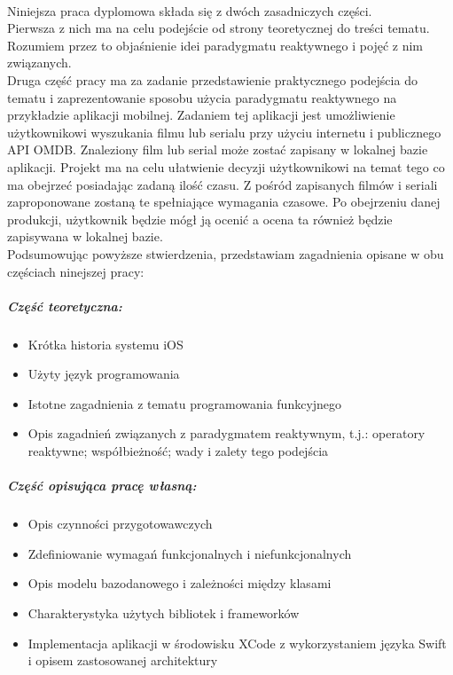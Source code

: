 \documentclass[11pt,twoside,a4paper]{report}
\begin{document}
\paragraph{}Niniejsza praca dyplomowa składa się z dwóch zasadniczych części.\\Pierwsza z nich ma na celu podejście od strony teoretycznej do treści tematu. Rozumiem przez to objaśnienie idei paradygmatu reaktywnego i pojęć z nim związanych.\\Druga część pracy ma za zadanie przedstawienie praktycznego podejścia do tematu i zaprezentowanie sposobu użycia paradygmatu reaktywnego na przykładzie aplikacji mobilnej. Zadaniem tej aplikacji jest umożliwienie użytkownikowi wyszukania filmu lub serialu przy użyciu internetu i publicznego API OMDB. Znaleziony film lub serial może zostać zapisany w lokalnej bazie aplikacji. Projekt ma na celu ułatwienie decyzji użytkownikowi na temat tego co ma obejrzeć posiadając zadaną ilość czasu. Z pośród zapisanych filmów i seriali zaproponowane zostaną te spełniające wymagania czasowe. Po obejrzeniu danej produkcji, użytkownik będzie mógł ją ocenić a ocena ta również będzie zapisywana w lokalnej bazie.\\
Podsumowując powyższe stwierdzenia, przedstawiam zagadnienia opisane w obu częściach ninejszej pracy:
\subparagraph{Część teoretyczna:}
\begin{itemize}
	\item Krótka historia systemu iOS
	\item Użyty język programowania
	\item Istotne zagadnienia z tematu programowania funkcyjnego
	\item Opis zagadnień związanych z paradygmatem reaktywnym, t.j.: operatory reaktywne; współbieżność; wady i zalety tego podejścia
\end{itemize}
\subparagraph{Część opisująca pracę własną:}

\begin{itemize}
	\item Opis czynności przygotowawczych
	\item Zdefiniowanie wymagań funkcjonalnych i niefunkcjonalnych
	\item Opis modelu bazodanowego i zależności między klasami
	\item Charakterystyka użytych bibliotek i frameworków
	\item Implementacja aplikacji w środowisku XCode z wykorzystaniem języka Swift i opisem zastosowanej architektury
\end{itemize}
\end{document}
